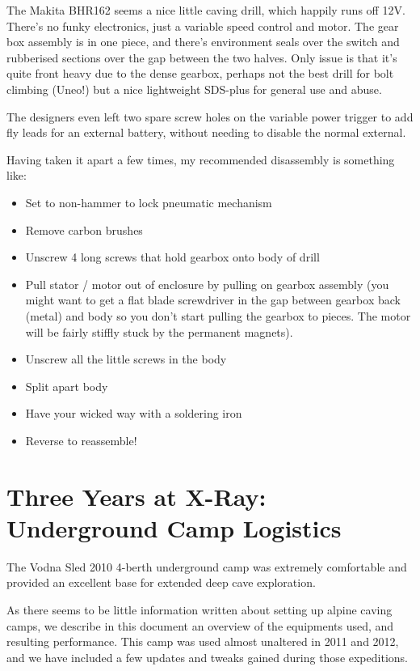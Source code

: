 The Makita BHR162 seems a nice little caving drill, which happily runs
off 12V. There’s no funky electronics, just a variable speed control
and motor. The gear box assembly is in one piece, and there’s
environment seals over the switch and rubberised sections over the gap
between the two halves. Only issue is that it’s quite front heavy due
to the dense gearbox, perhaps not the best drill for bolt climbing
(Uneo!) but a nice lightweight SDS-plus for general use and abuse.

The designers even left two spare screw holes on the variable power
trigger to add fly leads for an external battery, without needing to
disable the normal external.

Having taken it apart a few times, my recommended disassembly is something like:

\begin{itemize}
    \item Set to non-hammer to lock pneumatic mechanism
    \item Remove carbon brushes
    \item Unscrew 4 long screws that hold gearbox onto body of drill
    \item Pull stator / motor out of enclosure by pulling on gearbox assembly (you might want to get a flat blade screwdriver in the gap between gearbox back (metal) and body so you don’t start pulling the gearbox to pieces. The motor will be fairly stiffly stuck by the permanent magnets).
    \item Unscrew all the little screws in the body
    \item Split apart body
    \item Have your wicked way with a soldering iron
    \item Reverse to reassemble!
\end{itemize}





\newpage

\section{Three Years at X-Ray: Underground Camp
Logistics}

The Vodna Sled 2010 4-berth underground camp was extremely comfortable
and provided an excellent base for extended deep cave exploration.

As there seems to be little information written about setting up alpine
caving camps, we describe in this document an overview of the equipments
used, and resulting performance. This camp was used almost unaltered in
2011 and 2012, and we have included a few updates and tweaks gained
during those expeditions.


